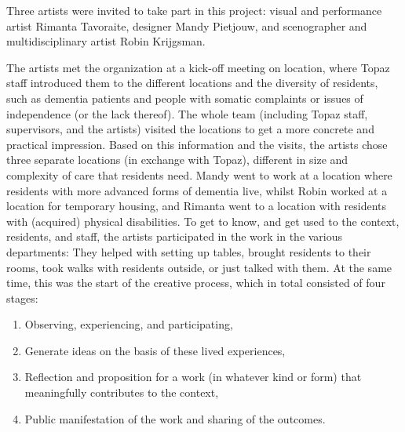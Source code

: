 \documentclass[authordate, empirical]{jote-new-article}
\begin{document}
	Three artists were invited to take part in this project: visual and performance artist Rimanta Tavoraite, designer Mandy Pietjouw, and scenographer and multidisciplinary artist Robin Krijgsman.







	The artists met the organization at a kick-off meeting on location, where Topaz staff introduced them to the different locations and the diversity of residents, such as dementia patients and people with somatic complaints or issues of independence (or the lack thereof). The whole team (including Topaz staff, supervisors, and the artists) visited the locations to get a more concrete and practical impression. Based on this information and the visits, the artists chose three separate locations (in exchange with Topaz), different in size and complexity of care that residents need. Mandy went to work at a location where residents with more advanced forms of dementia live, whilst Robin worked at a location for temporary housing, and Rimanta went to a location with residents with (acquired) physical disabilities. To get to know, and get used to the context, residents, and staff, the artists participated in the work in the various departments: They helped with setting up tables, brought residents to their rooms, took walks with residents outside, or just talked with them. At the same time, this was the start of the creative process, which in total consisted of four stages:





	\begin{enumerate}


		\item Observing, experiencing, and participating,



		\item Generate ideas on the basis of these lived experiences,



		\item Reflection and proposition for a work (in whatever kind or form) that meaningfully contributes to the context,



		\item Public manifestation of the work and sharing of the outcomes.


	\end{enumerate}
\end{document}
